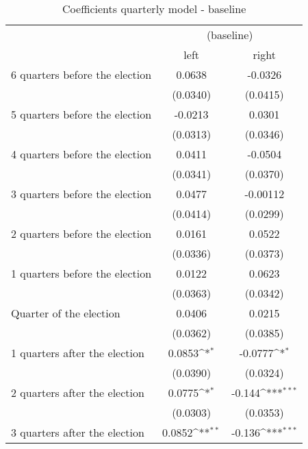 \begin{table}[htbp]\centering \scriptsize
\def\sym#1{\ifmmode^{#1}\else\(^{#1}\)\fi}
\caption{Coefficients quarterly model - baseline}
\begin{tabular}{l*{2}{c}}
\hline\hline
                    &\multicolumn{2}{c}{(baseline)} \\
                    &\multicolumn{1}{c}{left}&\multicolumn{1}{c}{right}\\
\hline
 6 quarters before the election&      0.0638         &     -0.0326         \\
                    &    (0.0340)         &    (0.0415)         \\
[0,12em]
 5 quarters before the election&     -0.0213         &      0.0301         \\
                    &    (0.0313)         &    (0.0346)         \\
[0,12em]
 4 quarters before the election&      0.0411         &     -0.0504         \\
                    &    (0.0341)         &    (0.0370)         \\
[0,12em]
 3 quarters before the election&      0.0477         &    -0.00112         \\
                    &    (0.0414)         &    (0.0299)         \\
[0,12em]
 2 quarters before the election&      0.0161         &      0.0522         \\
                    &    (0.0336)         &    (0.0373)         \\
[0,12em]
 1 quarters before the election&      0.0122         &      0.0623         \\
                    &    (0.0363)         &    (0.0342)         \\
[0,12em]
Quarter of the election&      0.0406         &      0.0215         \\
                    &    (0.0362)         &    (0.0385)         \\
[0,12em]
 1 quarters after the election&      0.0853\sym{*}  &     -0.0777\sym{*}  \\
                    &    (0.0390)         &    (0.0324)         \\
[0,12em]
 2 quarters after the election&      0.0775\sym{*}  &      -0.144\sym{***}\\
                    &    (0.0303)         &    (0.0353)         \\
[0,12em]
 3 quarters after the election&      0.0852\sym{**} &      -0.136\sym{***}\\

\end{tabular}
\end{table}
